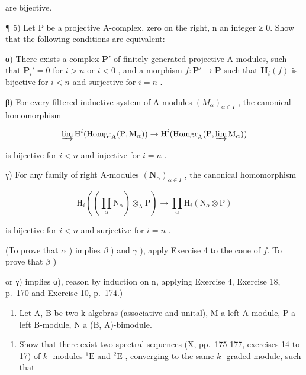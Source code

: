 are bijective.

¶ 5) Let P be a projective A-complex, zero on the right, n an integer ≥ 0. Show that the following conditions are equivalent:

α) There exists a complex \(\mathbf{P}'\) of finitely generated projective A-modules, such that \(\mathbf{P}_i' = 0\) for \(i > n\) or \(i < 0\) , and a morphism \(f: \mathbf{P}' \to \mathbf{P}\) such that \(\mathbf{H}_i(f)\) is bijective for \(i < n\) and surjective for \(i = n\) .

β) For every filtered inductive system of A-modules \((M_{\alpha})_{\alpha \in I}\) , the canonical homomorphism

\[
\varinjlim \mathrm{H} ^ {i} (\operatorname{Homgr} _ {\mathrm{A}} (\mathrm{P}, \mathrm{M} _ {\alpha})) \rightarrow \mathrm{H} ^ {i} (\operatorname{Homgr} _ {\mathrm{A}} (\mathrm{P}, \varinjlim \mathrm{M} _ {\alpha}))
\]

is bijective for \(i < n\) and injective for \(i = n\) .

γ) For any family of right A-modules \((\mathbf{N}_{\alpha})_{\alpha\in I}\) , the canonical homomorphism

\[
\mathrm{H} _ {i} ((\prod_ {\alpha} \mathrm{N} _ {\alpha}) \otimes_ {\mathrm{A}} \mathrm{P}) \rightarrow \prod_ {\alpha} \mathrm{H} _ {i} (\mathrm{N} _ {\alpha} \otimes \mathrm{P})
\]

is bijective for \(i < n\) and surjective for \(i = n\) .

(To prove that \(\alpha\) ) implies \(\beta\) ) and \(\gamma\) ), apply Exercise 4 to the cone of \(f\). To prove that \(\beta\) )

or γ) implies α), reason by induction on n, applying Exercise 4, Exercise 18, p.~170 and Exercise 10, p.~174.)

\begin{enumerate}
\def\labelenumi{\arabic{enumi})}
\setcounter{enumi}{5}
\tightlist
\item
  Let A, B be two k-algebras (associative and unital), M a left A-module, P a left B-module, N a (B, A)-bimodule.
\end{enumerate}

\begin{enumerate}
\def\labelenumi{\alph{enumi})}
\tightlist
\item
  Show that there exist two spectral sequences (X, pp.~175-177, exercises 14 to 17) of \(k\) -modules \({}^{1}\mathrm{E}\) and \({}^{2}\mathrm{E}\) , converging to the same \(k\) -graded module, such that
\end{enumerate}

